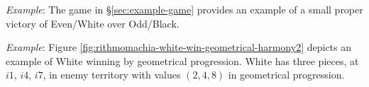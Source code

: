 \documentclass[14pt]{extarticle}
\begin{document}
\noindent
{\it Example}:
The game in \S \ref{sec:example-game} provides an example
of a small proper victory of Even/White over Odd/Black.




\noindent
{\it Example}:
Figure \ref{fig:rithmomachia-white-win-geometrical-harmony2} depicts an
example of White winning by geometrical progression.
White has three pieces, at $i1$, $i4$, $i7$,
in enemy territory with values $(2, 4, 8)$ in geometrical progression.
\end{document}
